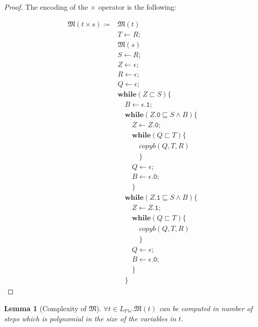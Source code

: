 \documentclass[10pt]{amsart}
\newcommand{\Wl}{\mathbb{PW}}
\newcommand{\zero}{\mathtt{0}}
\newcommand{\one}{\mathtt{1}}
\newcommand{\while}[2]{\mathbf{while}(#1)\{#2\}}
\newcommand{\takes}{\leftarrow}
\newcommand{\MM}{\mathfrak M}
\newtheorem{lemma}{Lemma}
\begin{document}
\begin{proof}
The encoding of the $\times$ operator is the following:

\begin{align*}
\MM(t \times s)\coloneqq &
\MM(t)\\
& T \takes R;\\
& \MM(s)\\
& S \takes R;\\
& Z \takes \epsilon;\\
& R \takes \epsilon;\\
& Q \takes \epsilon;\\
& \while {Z \sqsubset S} { \\
& \quad B \takes \epsilon.\one;\\
& \quad \while{Z.\zero \sqsubseteq S \land B} {\\
& \quad \quad Z \takes Z.\zero;\\
& \quad \quad \while {Q \sqsubset T} {\\
& \quad \quad \quad copyb(Q, T, R)\\
& \quad \quad \quad }\\
& \quad \quad Q \takes \epsilon;\\
& \quad \quad B \takes \epsilon.\zero;\\
& \quad \quad }\\
& \quad \while{Z.\one \sqsubseteq S \land B} {\\
& \quad \quad Z \takes Z.\one;\\
& \quad \quad \while {Q \sqsubset T} {\\
& \quad \quad \quad copyb(Q, T, R)\\
& \quad \quad \quad }\\
& \quad \quad Q \takes \epsilon;\\
& \quad \quad B \takes \epsilon.\zero;\\
& \quad \quad }\\
& \quad }
\end{align*}

\end{proof}

\begin{lemma}[Complexity of $\MM$]
\label{lemma:compmm}
$\forall t \in L_\Wl. \MM(t)$ can be computed in number of steps which is polynomial in the size of the variables in $t$.
\end{lemma}
\end{document}
